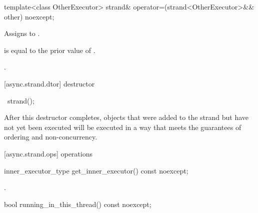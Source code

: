 \begin{itemdecl}
template<class OtherExecutor> strand& operator=(strand<OtherExecutor>&& other) noexcept;
\end{itemdecl}

\begin{itemdescr}
\pnum
{}

\pnum
\effects Assigns  to .

\pnum
\postconditions {} is equal to the prior value of .

\pnum
\returns {}.
\end{itemdescr}



[async.strand.dtor]{ destructor}

%
\begin{itemdecl}
~strand();
\end{itemdecl}

\begin{itemdescr}
\pnum
\effects {}
After this destructor completes, objects that were added to the strand but have not yet been executed will be executed in a way that meets the guarantees of ordering and non-concurrency.
\end{itemdescr}



[async.strand.ops]{ operations}

%
\begin{itemdecl}
inner_executor_type get_inner_executor() const noexcept;
\end{itemdecl}

\begin{itemdescr}
\pnum
\returns {}.
\end{itemdescr}

%
\begin{itemdecl}
bool running_in_this_thread() const noexcept;
\end{itemdecl}

